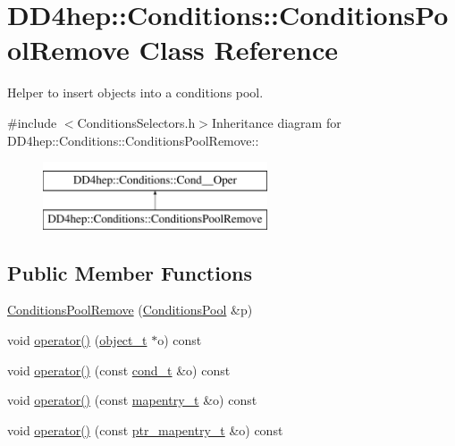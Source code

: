 \hypertarget{class_d_d4hep_1_1_conditions_1_1_conditions_pool_remove}{
\section{DD4hep::Conditions::ConditionsPoolRemove Class Reference}
\label{class_d_d4hep_1_1_conditions_1_1_conditions_pool_remove}
}


Helper to insert objects into a conditions pool.  


{\ttfamily \#include $<$ConditionsSelectors.h$>$}Inheritance diagram for DD4hep::Conditions::ConditionsPoolRemove::\begin{figure}[H]
\begin{center}
\leavevmode
\includegraphics[height=2cm]{class_d_d4hep_1_1_conditions_1_1_conditions_pool_remove}
\end{center}
\end{figure}
\subsection*{Public Member Functions}
\begin{DoxyCompactItemize}
\item 
\hyperlink{class_d_d4hep_1_1_conditions_1_1_conditions_pool_remove_abc0edc988a0117b97e68d824cb07da9c}{ConditionsPoolRemove} (\hyperlink{class_d_d4hep_1_1_conditions_1_1_conditions_pool}{ConditionsPool} \&p)
\item 
void \hyperlink{class_d_d4hep_1_1_conditions_1_1_conditions_pool_remove_ae57cebd122ce28cedf297c530a7795b3}{operator()} (\hyperlink{class_d_d4hep_1_1_conditions_1_1_interna_1_1_condition_object}{object\_\-t} $\ast$o) const 
\item 
void \hyperlink{class_d_d4hep_1_1_conditions_1_1_conditions_pool_remove_a85d2a1b3bd59d37678b1ea505bcac116}{operator()} (const \hyperlink{class_d_d4hep_1_1_conditions_1_1_condition}{cond\_\-t} \&o) const 
\item 
void \hyperlink{class_d_d4hep_1_1_conditions_1_1_conditions_pool_remove_a9b69cfdab677208fa5b46a5863999372}{operator()} (const \hyperlink{class_d_d4hep_1_1_conditions_1_1_cond_____oper_a877dac3da66795207aed15be219acbdc}{mapentry\_\-t} \&o) const 
\item 
void \hyperlink{class_d_d4hep_1_1_conditions_1_1_conditions_pool_remove_a24529ef74e78b830ad29273488ed95d8}{operator()} (const \hyperlink{class_d_d4hep_1_1_conditions_1_1_cond_____oper_a0949e4bd5f90cd3fae2394cf30983973}{ptr\_\-mapentry\_\-t} \&o) const 
\end{DoxyCompactItemize}
